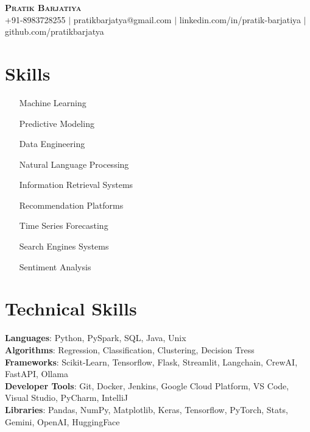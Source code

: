 \documentclass[letterpaper,11pt]{article}
\begin{document}

\begin{center}
    \textbf{\Huge \scshape Pratik Barjatiya} \\ \vspace{1pt}
    \small {\faMobile} +91-8983728255 $|$ \href{mailto:pratikbarjatya@gmail.com}  {\faEnvelope}{pratikbarjatya@gmail.com} $|$ 
    \href{https://linkedin.com/in/pratik-barjatiya} {\faLinkedin} {linkedin.com/in/pratik-barjatiya} $|$
    \href{https://github.com/pratikbarjatya} {\faGithub} {github.com/pratikbarjatya}
\end{center}

\section{Skills}
    \begin{multicols}{3}
        \begin{itemize}[itemsep=-2px, parsep=1pt, leftmargin=160pt]
          \item[Machine Learning]
          \item[Predictive Modeling]
          \item[Data Engineering]
          \item[Natural Language Processing]
          \item[Information Retrieval Systems]
          \item[Recommendation Platforms]
          \item[Time Series Forecasting]
          \item[Search Engines Systems]
          \item[Sentiment Analysis]
        \end{itemize}
    \end{multicols}

\section{Technical Skills}
 \begin{itemize}[leftmargin=0.15in, label={}]
    \small{\item{
     \textbf{Languages}{: Python, PySpark, SQL, Java, Unix} \\
     \textbf{Algorithms}{: Regression, Classification, Clustering, Decision Tress} \\
     \textbf{Frameworks}{: Scikit-Learn, Tensorflow, Flask, Streamlit, Langchain, CrewAI, FastAPI, Ollama} \\
     \textbf{Developer Tools}{: Git, Docker, Jenkins, Google Cloud Platform, VS Code, Visual Studio, PyCharm, IntelliJ} \\
     \textbf{Libraries}{: Pandas, NumPy, Matplotlib, Keras, Tensorflow, PyTorch, Stats, Gemini, OpenAI, HuggingFace}
    }}
 \end{itemize}
\end{document}
